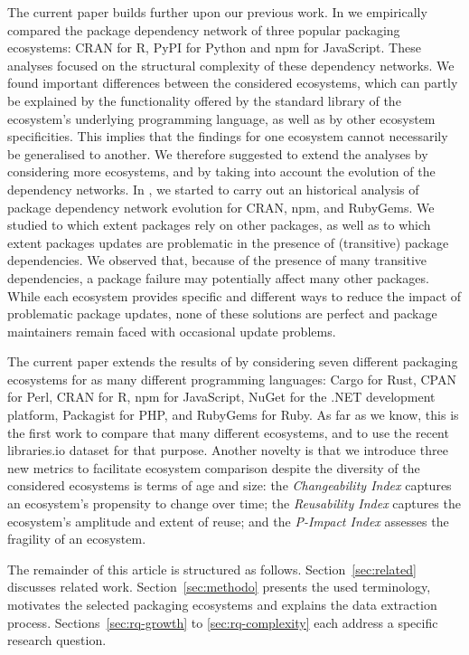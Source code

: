 \documentclass[smallextended]{svjour3}       %
\newcommand{\sect}[1]{Section~\ref{#1}}
\newcommand{\cran}{\textsf{CRAN}\xspace}
\newcommand{\cpan}{\textsf{CPAN}\xspace}
\newcommand{\pypi}{\textsf{PyPI}\xspace}
\newcommand{\rubygems}{\textsf{RubyGems}\xspace}
\newcommand{\packagist}{\textsf{Packagist}\xspace}
\newcommand{\cargo}{\textsf{Cargo}\xspace}
\newcommand{\nuget}{\textsf{NuGet}\xspace}
\newcommand{\npm}{\textsf{npm}\xspace}
\newcommand{\javascript}{\textsf{JavaScript}\xspace}
\newcommand{\ruby}{\textsf{Ruby}\xspace}
\newcommand{\python}{\textsf{Python}\xspace}
\newcommand{\R}{\textsf{R}\xspace}
\newcommand{\perl}{\textsf{Perl}\xspace}
\newcommand{\php}{\textsf{PHP}\xspace}
\newcommand{\rust}{\textsf{Rust}\xspace}
\newcommand{\dotnet}{\textsf{.NET}\xspace}
\begin{document}
The current paper builds further upon our previous work. In \cite{Decan2016WEA} we empirically compared the package dependency network of three popular packaging ecosystems: \cran for \R, \pypi for \python and \npm for \javascript. These analyses focused on the structural complexity of these dependency networks. We found important differences between the considered ecosystems, which can partly be explained by the functionality offered by the standard library of the ecosystem's underlying programming language, as well as by other ecosystem specificities. This implies that the findings for one ecosystem cannot necessarily be generalised to another. We therefore suggested to extend the analyses by considering more ecosystems, and by taking into account the evolution of the dependency networks. 
%
In \cite{Decan2017SANER}, we started to carry out an historical analysis of package dependency network evolution for \cran, \npm, and \rubygems. We studied to which extent packages rely on other packages, as well as to which extent packages updates are problematic in the presence of (transitive) package dependencies. We observed that, because of the presence of many transitive dependencies, a package failure may potentially affect many other packages. 
While each ecosystem provides specific and different ways to reduce the impact of problematic package updates, none of these solutions are perfect and package maintainers remain faced with occasional update problems.

The current paper extends the results of \cite{Decan2017SANER} by considering seven different packaging ecosystems for as many different programming languages: \cargo for \rust, \cpan for \perl, \cran for \R, \npm for \javascript, \nuget for the \dotnet development platform, \packagist for \php, and \rubygems for \ruby. As far as we know, this is the first work to compare that many different ecosystems, and to use the recent l\textsf{ibraries.io} dataset for that purpose.
Another novelty is that we introduce three new metrics to facilitate ecosystem comparison despite the diversity of the considered ecosystems is terms of age and size: the \textit{Changeability Index} captures an ecosystem's propensity to change over time; the \textit{Reusability Index} captures the ecosystem's amplitude and extent of reuse; and the \textit{P-Impact Index} assesses the fragility of an ecosystem. 


The remainder of this article is structured as follows.
\sect{sec:related} discusses related work.
\sect{sec:methodo} presents the used terminology, motivates the selected packaging ecosystems and explains the data extraction process.
Sections~\ref{sec:rq-growth} to \ref{sec:rq-complexity} each address a specific research question.
\end{document}
